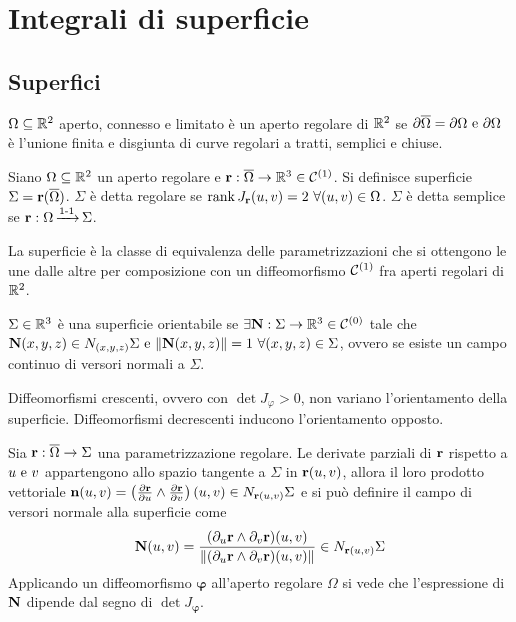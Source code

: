 \chapter{Integrali di superficie}

\section{Superfici}

\begin{definition}
	$\Omega \subseteq \mathbb{R}^2$ aperto, connesso e limitato è un aperto regolare di $\mathbb{R}^2$ se $\partial \overline{\Omega}=\partial \Omega \text{ e } \partial \Omega$ è l'unione finita e disgiunta di curve regolari a tratti, semplici e chiuse.
\end{definition}

\begin{definition}
	[Superficie]
	Siano $\Omega \subseteq \mathbb{R}^2$ un aperto regolare e $\vb{r}:\overline{\Omega}\to \mathbb{R}^3 \in \mathcal{C}^{(1)}$. Si definisce superficie $\Sigma=\vb{r}(\overline{\Omega})$.
	$\Sigma$ è detta regolare se $\rank{J_{\vb{r}}(u,v)} = 2 \ \forall (u,v) \in \Omega$.
	$\Sigma$ è detta semplice se $\vb{r}:\Omega \operatorname{\xrightarrow{\operatorname{1-1}}} \Sigma$.
\end{definition}

\begin{remark}
	La superficie è la classe di equivalenza delle parametrizzazioni che si ottengono le une dalle altre per composizione con un diffeomorfismo $\mathcal{C}^{(1)}$ fra aperti regolari di $\mathbb{R}^2$.
\end{remark}

\begin{definition}
	$\Sigma \in \mathbb{R}^3$ è una superficie orientabile se $\exists \vb{N}:\Sigma \to \mathbb{R}^3 \in \mathcal{C}^{(0)}$ tale che $\vb{N}(x,y,z)\in N_{(x,y,z)}\Sigma \text{ e } \norm{\vb{N}(x,y,z)}=1 \ \forall (x,y,z) \in \Sigma$, ovvero se esiste un campo continuo di versori normali a $\Sigma$.
\end{definition}

\begin{remark}
	Diffeomorfismi crescenti, ovvero con $\det J_\varphi>0$, non variano l'orientamento della superficie. Diffeomorfismi decrescenti inducono l'orientamento opposto.
\end{remark}

Sia $\vb{r}:\overline{\Omega} \to \Sigma$ una parametrizzazione regolare. Le derivate parziali di $\vb{r}$ rispetto a $u \text{ e } v$ appartengono allo spazio tangente a $\Sigma$ in $\vb{r}(u,v)$, allora il loro prodotto vettoriale $\vb{n}(u,v)=\left(\frac{\partial \vb{r}}{\partial u}\wedge\frac{\partial \vb{r}}{\partial v}\right)(u,v) \in N_{\vb{r}(u,v)}\Sigma$ e si può definire il campo di versori normale alla superficie come
$$
	\vb{N}(u,v)=\frac{(\partial_u\vb{r}\wedge\partial_v\vb{r})(u,v)}{\norm{(\partial_u\vb{r}\wedge\partial_v\vb{r})(u,v)}}\in N_{\vb{r}(u,v)}\Sigma
$$
Applicando un diffeomorfismo $\bm\varphi$ all'aperto regolare $\Omega$ si vede che l'espressione di $\vb{N}$ dipende dal segno di $\det J_{\bm\varphi}$.

